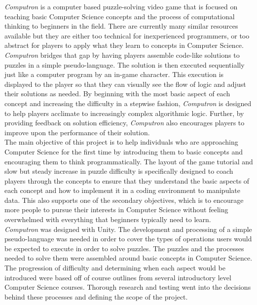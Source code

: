 \textit{Computron} is a computer based puzzle-solving video game that is focused 
on teaching basic Computer Science concepts and the process of computational 
thinking to beginners in the field. There are currently many similar resources 
available but they are either too technical for inexperienced programmers, or
 too abstract for players to apply what they learn to concepts in Computer 
Science. \textit{Computron} bridges that gap by having players assemble code-like 
solutions to puzzles in a simple pseudo-language. The solution is then executed 
sequentially just like a computer program by an in-game character. This 
execution is displayed to the player so that they can visually see the flow of 
logic and adjust their solutions as needed. By beginning with the most basic 
aspect of each concept and increasing the difficulty in a stepwise fashion, 
\textit{Computron} is designed to help players acclimate to increasingly complex 
algorithmic logic. Further, by providing feedback on solution efficiency, 
\textit{Computron} also encourages players to improve upon the performance of 
their solution.\\

The main objective of this project is to help individuals who are approaching 
Computer Science for the first time by introducing them to basic concepts and 
encouraging them to think programmatically. The layout of the game tutorial 
and slow but steady increase in puzzle difficulty is specifically designed to coach 
players through the concepts to ensure that they understand the basic aspects 
of each concept and how to implement it in a coding environment to manipulate 
data. This also supports one of the secondary objectives, which is to encourage 
more people to pursue their interests in Computer Science without feeling 
overwhelmed with everything that beginners typically need to learn.\\

\textit{Computron} was designed with Unity. The development and processing 
of a simple pseudo-language was needed in order to cover the types of 
operations users would be expected to execute in order to solve puzzles. The 
puzzles and the processes needed to solve them were assembled around basic 
concepts in Computer Science. The progression of difficulty and determining 
when each aspect would be introduced were based off of course outlines from 
several introductory level Computer Science courses. Thorough research and 
testing went into the decisions behind these processes and defining the scope 
of the project.\\